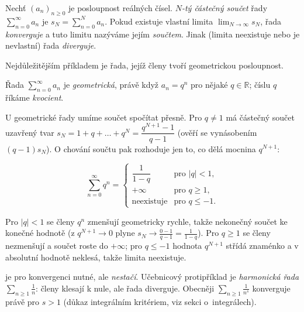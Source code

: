 \documentclass[11pt,a4paper]{article}
\begin{document}
\begin{definice}
Nechť $(a_n)_{n\ge0}$ je posloupnost reálných čísel. \emph{$N$-tý částečný součet} řady $\sum_{n=0}^{\infty}a_n$ je $s_N=\sum_{n=0}^{N}a_n$. Pokud existuje vlastní limita $\lim_{N\to\infty}s_N$, řada \emph{konverguje} a tuto limitu nazýváme jejím \emph{součtem}. Jinak (limita neexistuje nebo je nevlastní) řada \emph{diverguje}.
\end{definice}

Nejdůležitějším příkladem je řada, jejíž členy tvoří geometrickou posloupnost.

\begin{definice}
Řada $\sum_{n=0}^{\infty}a_n$ je \emph{geometrická}, právě když $a_n=q^n$ pro nějaké $q\in\mathbb{R}$; číslu $q$ říkáme \emph{kvocient}.
\end{definice}

U geometrické řady umíme součet spočítat přesně. Pro $q\neq1$ má částečný součet uzavřený tvar $s_N=1+q+\dots+q^N=\dfrac{q^{N+1}-1}{q-1}$ (ověří se vynásobením $(q-1)s_N$). O chování součtu pak rozhoduje jen to, co dělá mocnina $q^{N+1}$:

\begin{veta}
\[
  \sum_{n=0}^{\infty}q^n=
  \begin{cases}
    \dfrac{1}{1-q} & \text{pro } |q|<1,\\[2mm]
    +\infty & \text{pro } q\ge1,\\[1mm]
    \text{neexistuje} & \text{pro } q\le-1.
  \end{cases}
\]
\end{veta}

\begin{intuice}
Pro $|q|<1$ se členy $q^n$ zmenšují geometricky rychle, takže nekonečný součet  ke konečné hodnotě (z $q^{N+1}\to0$ plyne $s_N\to\tfrac{0-1}{q-1}=\tfrac1{1-q}$). Pro $q\ge1$ se členy nezmenšují a součet roste do $+\infty$; pro $q\le-1$ hodnota $q^{N+1}$ střídá znaménko a v absolutní hodnotě neklesá, takže limita neexistuje.
\end{intuice}

\begin{poznamka}
 je pro konvergenci nutné, ale \emph{nestačí}. Učebnicový protipříklad je \emph{harmonická řada} $\sum_{n\ge1}\tfrac1n$: členy klesají k nule, ale řada diverguje. Obecněji $\sum_{n\ge1}\tfrac1{n^s}$ konverguje právě pro $s>1$ (důkaz integrálním kritériem, viz sekci o~integrálech).
\end{poznamka}
\end{document}
